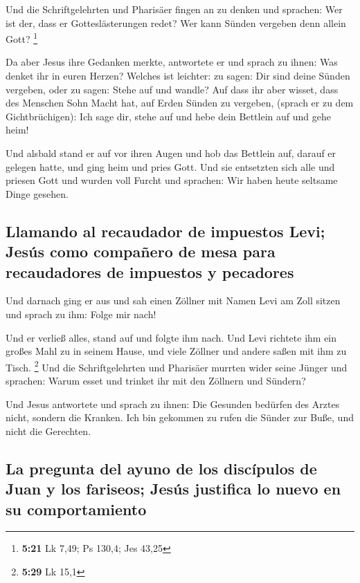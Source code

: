  Und die Schriftgelehrten und Pharisäer fingen an zu
denken und sprachen: Wer ist der, dass er Gotteslästerungen redet? Wer
kann Sünden vergeben denn allein Gott? \footnote{\textbf{5:21} Lk 7,49;
  Ps 130,4; Jes 43,25}

 Da aber Jesus ihre Gedanken merkte, antwortete er und
sprach zu ihnen: Was denket ihr in euren Herzen?  Welches
ist leichter: zu sagen: Dir sind deine Sünden vergeben, oder zu sagen:
Stehe auf und wandle?  Auf dass ihr aber wisset, dass des
Menschen Sohn Macht hat, auf Erden Sünden zu vergeben, (sprach er zu dem
Gichtbrüchigen): Ich sage dir, stehe auf und hebe dein Bettlein auf und
gehe heim!

 Und alsbald stand er auf vor ihren Augen und hob das
Bettlein auf, darauf er gelegen hatte, und ging heim und pries Gott.
 Und sie entsetzten sich alle und priesen Gott und wurden
voll Furcht und sprachen: Wir haben heute seltsame Dinge gesehen.

\hypertarget{llamando-al-recaudador-de-impuestos-levi-jesuxfas-como-compauxf1ero-de-mesa-para-recaudadores-de-impuestos-y-pecadores}{%
\subsection{Llamando al recaudador de impuestos Levi; Jesús como
compañero de mesa para recaudadores de impuestos y
pecadores}\label{llamando-al-recaudador-de-impuestos-levi-jesuxfas-como-compauxf1ero-de-mesa-para-recaudadores-de-impuestos-y-pecadores}}

 Und darnach ging er aus und sah einen Zöllner mit Namen
Levi am Zoll sitzen und sprach zu ihm: Folge mir nach!

 Und er verließ alles, stand auf und folgte ihm nach.
 Und Levi richtete ihm ein großes Mahl zu in seinem
Hause, und viele Zöllner und andere saßen mit ihm zu Tisch. \footnote{\textbf{5:29}
  Lk 15,1}  Und die Schriftgelehrten und Pharisäer
murrten wider seine Jünger und sprachen: Warum esset und trinket ihr mit
den Zöllnern und Sündern?

 Und Jesus antwortete und sprach zu ihnen: Die Gesunden
bedürfen des Arztes nicht, sondern die Kranken.  Ich bin
gekommen zu rufen die Sünder zur Buße, und nicht die Gerechten.

\hypertarget{la-pregunta-del-ayuno-de-los-discuxedpulos-de-juan-y-los-fariseos-jesuxfas-justifica-lo-nuevo-en-su-comportamiento}{%
\subsection{La pregunta del ayuno de los discípulos de Juan y los
fariseos; Jesús justifica lo nuevo en su
comportamiento}\label{la-pregunta-del-ayuno-de-los-discuxedpulos-de-juan-y-los-fariseos-jesuxfas-justifica-lo-nuevo-en-su-comportamiento}}

